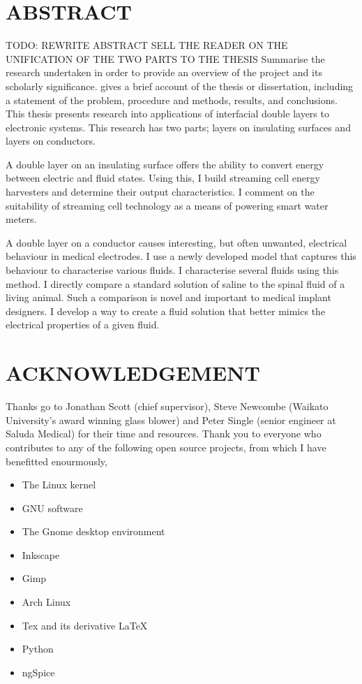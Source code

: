 





\rmfamily

\chapter*{ABSTRACT}
{\color{red}
TODO: REWRITE ABSTRACT
SELL THE READER ON THE UNIFICATION OF THE TWO PARTS TO THE THESIS
Summarise the research undertaken in order to provide an overview of the project and its scholarly significance. gives a brief account of the thesis or dissertation, including a statement of the problem, procedure and methods, results, and conclusions.
}
This thesis presents research into applications of interfacial double layers to electronic systems.
This research has two parts; layers on insulating surfaces and layers on conductors.

A double layer on an insulating surface offers the ability to convert energy between electric and fluid states.
Using this, I build streaming cell energy harvesters and determine their output characteristics.
I comment on the suitability of streaming cell technology as a means of powering smart water meters.

A double layer on a conductor causes interesting, but often unwanted, electrical behaviour in medical electrodes.
I use a newly developed model that captures this behaviour to characterise various fluids.
I characterise several fluids using this method.
I directly compare a standard solution of saline to the spinal fluid of a living animal.
Such a comparison is novel and important to medical implant designers.
I develop a way to create a fluid solution that better mimics the electrical properties of a given fluid.


\chapter*{ACKNOWLEDGEMENT}
Thanks go to Jonathan Scott (chief supervisor), Steve Newcombe (Waikato University's award winning glass blower) and Peter Single (senior engineer at Saluda Medical) for their time and resources.
Thank you to everyone who contributes to any of the following open source projects, from which I have benefitted enourmously,
\begin{itemize}
\item The Linux kernel
\item GNU software
\item The Gnome desktop environment
\item Inkscape
\item Gimp
\item Arch Linux
\item Tex and its derivative \LaTeX
\item Python
\item ngSpice
\end{itemize}

